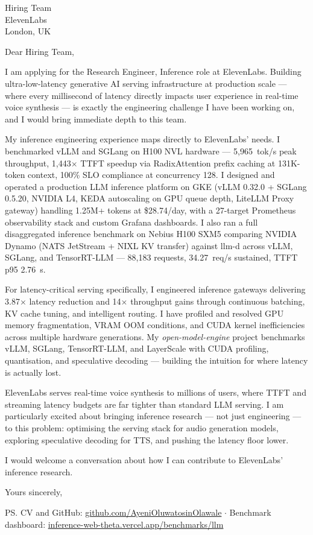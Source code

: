 \documentclass[12pt,a4paper]{letter}
\date{26 November 2026}
\begin{document}
\begin{letter}{Hiring Team \\ ElevenLabs \\ London, UK}

\opening{Dear Hiring Team,}

I am applying for the Research Engineer, Inference role at ElevenLabs. Building ultra-low-latency generative AI serving infrastructure at production scale — where every millisecond of latency directly impacts user experience in real-time voice synthesis — is exactly the engineering challenge I have been working on, and I would bring immediate depth to this team.

My inference engineering experience maps directly to ElevenLabs' needs. I benchmarked vLLM and SGLang on H100 NVL hardware — 5,965~tok/s peak throughput, 1,443$\times$ TTFT speedup via RadixAttention prefix caching at 131K-token context, 100\% SLO compliance at concurrency 128. I designed and operated a production LLM inference platform on GKE (vLLM 0.32.0 + SGLang 0.5.20, NVIDIA L4, KEDA autoscaling on GPU queue depth, LiteLLM Proxy gateway) handling 1.25M+ tokens at \$28.74/day, with a 27-target Prometheus observability stack and custom Grafana dashboards. I also ran a full disaggregated inference benchmark on Nebius H100 SXM5 comparing NVIDIA Dynamo (NATS JetStream + NIXL KV transfer) against llm-d across vLLM, SGLang, and TensorRT-LLM — 88,183 requests, 34.27~req/s sustained, TTFT p95 2.76~s.

For latency-critical serving specifically, I engineered inference gateways delivering 3.87$\times$ latency reduction and 14$\times$ throughput gains through continuous batching, KV cache tuning, and intelligent routing. I have profiled and resolved GPU memory fragmentation, VRAM OOM conditions, and CUDA kernel inefficiencies across multiple hardware generations. My \textit{open-model-engine} project benchmarks vLLM, SGLang, TensorRT-LLM, and LayerScale with CUDA profiling, quantisation, and speculative decoding — building the intuition for where latency is actually lost.

ElevenLabs serves real-time voice synthesis to millions of users, where TTFT and streaming latency budgets are far tighter than standard LLM serving. I am particularly excited about bringing inference research — not just engineering — to this problem: optimising the serving stack for audio generation models, exploring speculative decoding for TTS, and pushing the latency floor lower.

I would welcome a conversation about how I can contribute to ElevenLabs' inference research.

\closing{Yours sincerely,}

\ps{CV and GitHub: \href{https://github.com/AyeniOluwatosinOlawale}{github.com/AyeniOluwatosinOlawale} $\cdot$ Benchmark dashboard: \href{https://inference-web-theta.vercel.app/benchmarks/llm}{inference-web-theta.vercel.app/benchmarks/llm}}

\end{letter}
\end{document}
